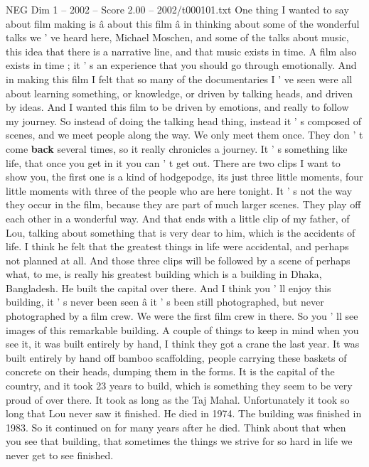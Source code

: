 \begin{textsample}{NEG Dim 1 – 2002 – Score 2.00 – 2002/t000101.txt}  \label{ex:f1_neg_062}
One thing I wanted to say about film making is â about this film â in thinking about some of the wonderful talks we ' ve heard here, Michael Moschen, and some of the talks about music, this idea that there is a narrative line, and that music exists in time.
A film also exists in time ; it ' s an experience that you should go through emotionally.
And in making this film I felt that so many of the documentaries I ' ve seen were all about learning something, or knowledge, or driven by talking heads, and driven by ideas.
And I wanted this film to be driven by emotions, and really to follow my journey.
So instead of doing the talking head thing, instead it ' s composed of scenes, and we meet people along the way.
We only meet them once.
They don ' t come \textbf{back} several times, so it really chronicles a journey.
It ' s something like life, that once you get in it you can ' t get out.
There are two clips I want to show you, the first one is a kind of hodgepodge, its just three little moments, four little moments with three of the people who are here tonight.
It ' s not the way they occur in the film, because they are part of much larger scenes.
They play off each other in a wonderful way.
And that ends with a little clip of my father, of Lou, talking about something that is very dear to him, which is the accidents of life.
I think he felt that the greatest things in life were accidental, and perhaps not planned at all.
And those three clips will be followed by a scene of perhaps what, to me, is really his greatest building which is a building in Dhaka, Bangladesh.
He built the capital over there.
And I think you ' ll enjoy this building, it ' s never been seen â it ' s been still photographed, but never photographed by a film crew.
We were the first film crew in there.
So you ' ll see images of this remarkable building.
A couple of things to keep in mind when you see it, it was built entirely by hand, I think they got a crane the last year.
It was built entirely by hand off bamboo scaffolding, people carrying these baskets of concrete on their heads, dumping them in the forms.
It is the capital of the country, and it took 23 years to build, which is something they seem to be very proud of over there.
It took as long as the Taj Mahal.
Unfortunately it took so long that Lou never saw it finished.
He died in 1974.
The building was finished in 1983.
So it continued on for many years after he died.
Think about that when you see that building, that sometimes the things we strive for so hard in life we never get to see finished.

\end{textsample}

